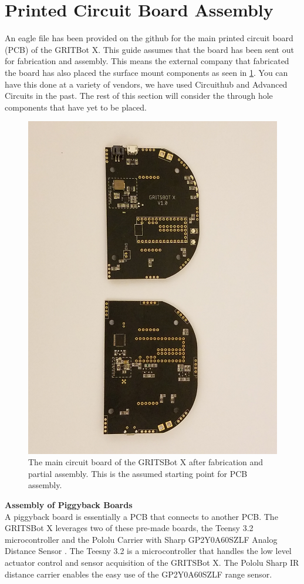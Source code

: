 \section{Printed Circuit Board Assembly}
\label{sec:pcb}

An eagle file has been provided on the github for the main printed circuit board (PCB) of the GRITBot X. This guide assumes that the board has been sent out for fabrication and  assembly. This means the external company that fabricated the board has also placed the surface mount components as seen in \cref{fig:pcbPlain}. You can have this done at a variety of vendors, we have used Circuithub \cite{circuithub} and Advanced Circuits \cite{advancedCircuits} in the past. The rest of this section will consider the through hole components that have yet to be placed.

\begin{figure}[t]
\centering
\includegraphics[width=0.65\columnwidth, keepaspectratio]{./figs/20181119_150313.jpg}
\caption{The main circuit board of the GRITSBot X after fabrication and partial assembly. This is the assumed starting point for PCB assembly.}
\label{fig:pcbPlain}
\end{figure}
\vspace{1cm}
\noindent\textbf{\large{Assembly of Piggyback Boards}}\\

 A piggyback board is essentially a PCB that connects to another PCB. The GRITSBot X leverages two of these pre-made boards, the Teensy 3.2 microcontroller \cite{teensy} and the Pololu Carrier with Sharp GP2Y0A60SZLF Analog Distance Sensor \cite{pololuDistance}. The Teesny 3.2 is a microcontroller that handles the low level actuator control and sensor acquisition of the GRITSBot X.  The Pololu Sharp IR distance carrier enables the easy use of the GP2Y0A60SZLF range sensor.
 

